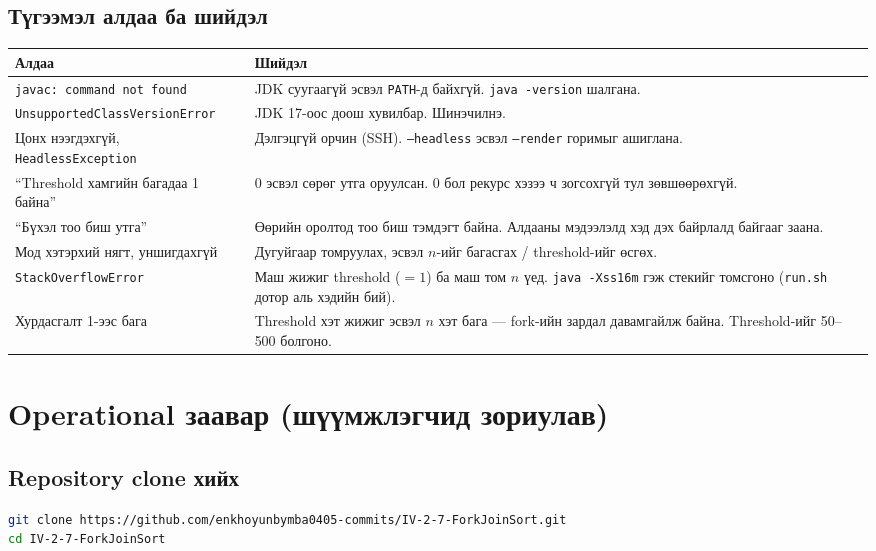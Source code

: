 \documentclass[11pt,a4paper]{article}
\begin{document}
\subsection{Түгээмэл алдаа ба шийдэл}
\begin{center}
\small
\begin{tabular}{L{5.2cm}L{9.3cm}}
\toprule
Алдаа & Шийдэл \\
\midrule
\texttt{javac: command not found} & JDK суугаагүй эсвэл \texttt{PATH}-д байхгүй.
\texttt{java -version} шалгана. \\
\texttt{UnsupportedClassVersionError} & JDK 17-оос доош хувилбар. Шинэчилнэ. \\
Цонх нээгдэхгүй, \texttt{HeadlessException} & Дэлгэцгүй орчин (SSH).
\texttt{--headless} эсвэл \texttt{--render} горимыг ашиглана. \\
``Threshold хамгийн багадаа 1 байна'' & 0 эсвэл сөрөг утга оруулсан.
0 бол рекурс хэзээ ч зогсохгүй тул зөвшөөрөхгүй. \\
``Бүхэл тоо биш утга'' & Өөрийн оролтод тоо биш тэмдэгт байна. Алдааны
мэдээлэлд хэд дэх байрлалд байгааг заана. \\
Мод хэтэрхий нягт, уншигдахгүй & Дугуйгаар томруулах, эсвэл $n$-ийг
багасгах / threshold-ийг өсгөх. \\
\texttt{StackOverflowError} & Маш жижиг threshold ($=1$) ба маш том $n$ үед.
\texttt{java -Xss16m} гэж стекийг томсгоно (\texttt{run.sh} дотор аль хэдийн бий). \\
Хурдасгалт 1-ээс бага & Threshold хэт жижиг эсвэл $n$ хэт бага --- fork-ийн
зардал давамгайлж байна. Threshold-ийг 50--500 болгоно. \\
\bottomrule
\end{tabular}
\end{center}

\newpage
\section{Operational заавар (шүүмжлэгчид зориулав)}

\subsection{Repository clone хийх}
\begin{lstlisting}[language=bash]
git clone https://github.com/enkhoyunbymba0405-commits/IV-2-7-ForkJoinSort.git
cd IV-2-7-ForkJoinSort
\end{lstlisting}
\end{document}
